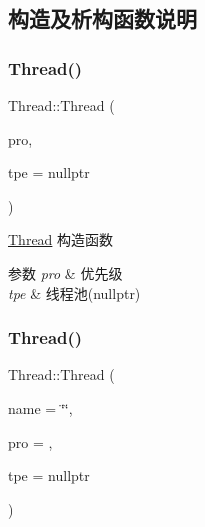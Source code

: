 \subsection{构造及析构函数说明}
\mbox{\label{classThread_a2375aeb8a227668652d593b180bac64e}} 
\subsubsection{\texorpdfstring{Thread()}{Thread()}\hspace{0.1cm}{\footnotesize\ttfamily [1/3]}}
{\footnotesize\ttfamily Thread\+::\+Thread (\begin{DoxyParamCaption}\item[{int}]{pro,  }\item[{\hyperlink{classThreadPoolExecutor}{Thread\+Pool\+Executor} $\ast$}]{tpe = {\ttfamily nullptr} }\end{DoxyParamCaption})\hspace{0.3cm}{\ttfamily [inline]}}



\hyperlink{classThread}{Thread} 构造函数 


\begin{DoxyParams}{参数}
{\em pro} & 优先级 \\
\hline
{\em tpe} & 线程池(nullptr) \\
\hline
\end{DoxyParams}
\mbox{\label{classThread_aa32c32f43d92d235c9e795bea80e9058}} 
\subsubsection{\texorpdfstring{Thread()}{Thread()}\hspace{0.1cm}{\footnotesize\ttfamily [2/3]}}
{\footnotesize\ttfamily Thread\+::\+Thread (\begin{DoxyParamCaption}\item[{const std\+::string \&}]{name = {\ttfamily \char`\"{}\char`\"{}},  }\item[{int}]{pro = {},  }\item[{\hyperlink{classThreadPoolExecutor}{Thread\+Pool\+Executor} $\ast$}]{tpe = {\ttfamily nullptr} }\end{DoxyParamCaption})\hspace{0.3cm}{\ttfamily [inline]}}



